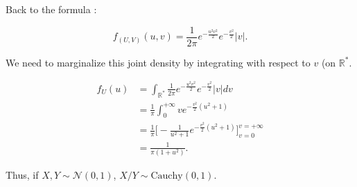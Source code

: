 Back to the formula :

$$f_{(U,V)}(u,v) = \frac1{2\pi} e^{-\frac{u^2v^2}{2}} e^{-\frac{v^2}{2}} \lvert v \lvert.$$

We need to marginalize this joint density by integrating with respect to $v$ (on $\mathbb{R}^{*}$.

\begin{align*}
    f_U(u) &= \displaystyle \int_{\mathbb{R}^{*}} \frac1{2\pi} e^{-\frac{u^2v^2}{2}} e^{-\frac{v^2}{2}} \lvert v \lvert dv\\
    &= \frac1{\pi} \displaystyle \int_{0}^{+\infty} v e^{-\frac{v^2}{2}(u^2+1)}\\
    &= \frac1{\pi} \Big[-\frac1{u^2+1} e^{-\frac{v^2}{2}(u^2+1)}\Big]_{v=0}^{v = +\infty}\\
    &= \frac1{\pi (1+u^2)}.
\end{align*}

Thus, if $X, Y \sim \mathcal{N}(0,1)$, $X/Y \sim \text{Cauchy}(0, 1).$